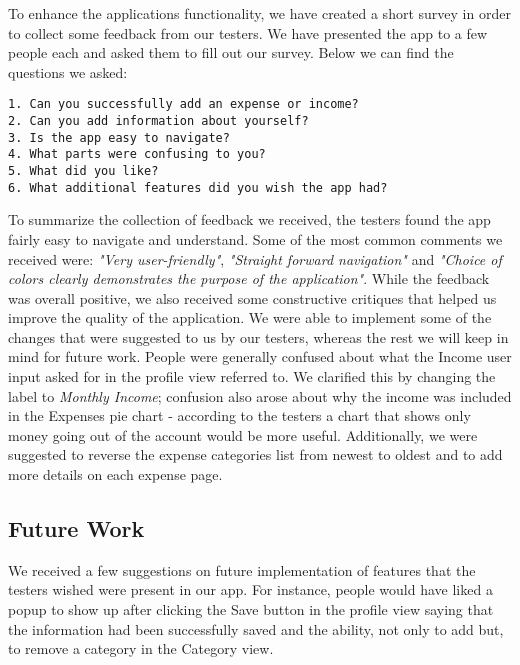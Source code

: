 \documentclass{article}
\begin{document}
\vskip 0.2in
    To enhance the applications functionality, we have created a short survey in order to collect some feedback from our testers. We have presented the app to a few people each and asked them to fill out our survey. Below we can find the questions we asked:
\begin{verbatim} 
1. Can you successfully add an expense or income? 
2. Can you add information about yourself?
3. Is the app easy to navigate? 
4. What parts were confusing to you?
5. What did you like?
6. What additional features did you wish the app had? 
\end{verbatim} 

To summarize the collection of feedback we received, the testers found the app fairly easy to navigate and understand. Some of the most common comments we received were: \emph{"Very user-friendly"}, \emph{"Straight forward navigation"} and \emph{"Choice of colors clearly demonstrates the purpose of the application"}. While the feedback was overall positive, we also received some constructive critiques that helped us improve the quality of the application. We were able to implement some of the changes that were suggested to us by our testers, whereas the rest we will keep in mind for future work. People were generally confused about what the Income user input asked for in the profile view referred to. We clarified this by changing the label to \emph{Monthly Income}; confusion also arose about why the income was included in the Expenses pie chart - according to the testers a chart that shows only money going out of the account would be more useful. Additionally, we were suggested to reverse the expense categories list from newest to oldest and to add more details on each expense page. 

\subsection{Future Work}
We received a few suggestions on future implementation of features that the testers wished were present in our app. For instance, people would have liked a popup to show up after clicking the Save button in the profile view saying that the information had been successfully saved and the ability, not only to add but, to remove a category in the Category view.
\end{document}
